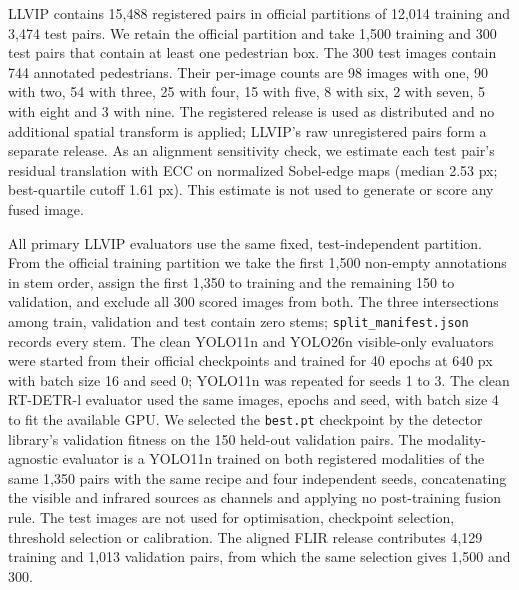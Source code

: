 \documentclass[preprint,10pt]{elsarticle}
\begin{document}
LLVIP contains 15,488 registered pairs in official partitions of 12,014 training and
3,474 test pairs. We retain the official partition and take 1,500 training and 300 test
pairs that contain at least one pedestrian box. The 300 test images contain 744 annotated
pedestrians. Their per-image counts are 98 images with one, 90 with two, 54 with three,
25 with four, 15 with five, 8 with six, 2 with seven, 5 with eight and 3 with nine. The
registered release is used as distributed and no additional spatial transform is applied;
LLVIP's raw unregistered pairs form a separate release. As an alignment sensitivity check,
we estimate each test pair's residual translation with ECC on normalized Sobel-edge maps
(median 2.53 px; best-quartile cutoff 1.61 px). This estimate is not used to generate or
score any fused image.

All primary LLVIP evaluators use the same fixed, test-independent partition. From the
official training partition we take the first 1,500 non-empty annotations in stem order,
assign the first 1,350 to training and the remaining 150 to validation, and exclude all
300 scored images from both. The three intersections among train, validation and test
contain zero stems; \texttt{split\_manifest.json} records every stem. The clean
YOLO11n and YOLO26n visible-only evaluators were started from their official checkpoints
and trained for 40 epochs at $640$ px with batch size 16 and seed 0;
YOLO11n was repeated for seeds 1 to 3. The clean RT-DETR-l evaluator used the same
images, epochs and seed, with batch size 4 to fit the available GPU. We selected the
\texttt{best.pt} checkpoint by the detector library's validation fitness on the 150
held-out validation pairs. The modality-agnostic evaluator is a YOLO11n trained on both
registered modalities of the same 1,350 pairs with the same recipe and four independent
seeds, concatenating the visible and infrared sources as channels and applying no
post-training fusion rule. The test images are not used for optimisation, checkpoint
selection, threshold selection or calibration.
The aligned FLIR release contributes 4,129 training and 1,013 validation pairs, from
which the same selection gives 1,500 and 300.
\end{document}

